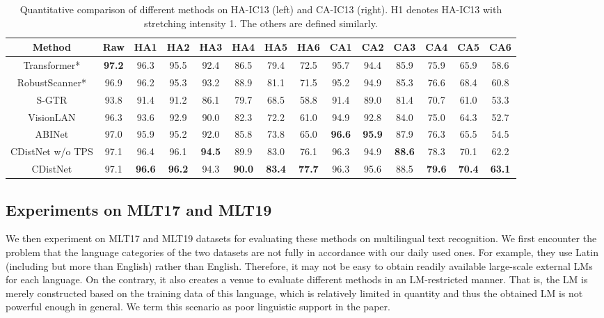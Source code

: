\begin{table*}{}
\setlength{\tabcolsep}{3pt}
\centering
\caption{Quantitative comparison of different methods on HA-IC13 (left) and CA-IC13 (right). H1 denotes HA-IC13 with stretching intensity 1. The others are defined similarly.}
\begin{tabular}{c|c|cccccc|cccccc}
\hline 
Method & Raw & HA1 & HA2 & HA3 & HA4 & HA5 & HA6 & CA1 & CA2 & CA3 & CA4 & CA5 & CA6\\
\hline
Transformer* \citep{sheng2019nrtr} & \textbf{97.2} & 96.3 & 95.5 & 92.4 & 86.5 & 79.4 & 72.5 & 95.7 & 94.4 & 85.9 & 75.9 & 65.9 & 58.6\\
RobustScanner* \citep{yue2020robustscanner}& 96.9 & 96.2 & 95.3 & 93.2 &  88.9 & 81.1 & 71.5 & 95.2 & 94.9 & 85.3 & 76.6 & 68.4 & 60.8 \\
S-GTR \citep{he2021S-GTR} & 93.8 & 91.4 & 91.2 & 86.1 & 79.7 & 68.5 & 58.8 & 91.4 & 89.0 & 81.4 & 70.7 & 61.0 & 53.3  \\
VisionLAN \citep{wang2021FTO} & 96.3 & 93.6 & 92.9 & 90.0 & 82.3 & 72.2 & 61.0 & 94.9 & 92.8 & 84.0 & 75.0 & 64.3 & 52.7  \\
ABINet \citep{ABInet21CVPR} & 97.0 & 95.9 & 95.2 & 92.0 & 85.8 & 73.8 & 65.0 & \textbf{96.6} &\textbf{95.9} & 87.9 & 76.3 & 65.5 & 54.5 \\
\hline
CDistNet w/o TPS & 97.1 & 96.4 & 96.1 & \textbf{94.5} & 89.9 & 83.0 &  76.1 & 96.3 & 94.9 & \textbf{88.6} & 78.3 & 70.1 &62.2 \\
CDistNet & 97.1 & \textbf{96.6} & \textbf{96.2} & 94.3 & \textbf{90.0} & \textbf{83.4} &  \textbf{77.7} & 96.3 & 95.6 & 88.5 & \textbf{79.6} & \textbf{70.4} &\textbf{63.1} \\
\hline
\end{tabular}
\label{table:HA_CA Ablation}
\end{table*}

\subsection{Experiments on MLT17 and MLT19}
We then experiment on MLT17 and MLT19 datasets for evaluating these methods on multilingual text recognition. We first encounter the problem that the language categories of the two datasets are not fully in accordance with our daily used ones. For example, they use Latin (including but more than English) rather than English. Therefore, it may not be easy to obtain readily available large-scale external LMs for each language. On the contrary, it also creates a venue to evaluate different methods in an LM-restricted manner. That is, the LM is merely constructed based on the training data of this language, which is relatively limited in quantity and thus the obtained LM is not powerful enough in general. We term this scenario as poor linguistic support in the paper.

